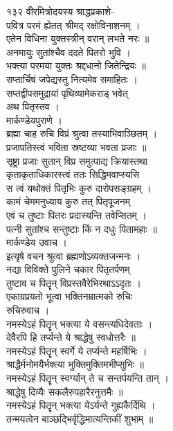 \documentclass[11pt, openany]{book}
\begin{document}
{{{{{{{{{{{{{{{{{{{{{{{{{{{{{{{{{{{{{{{{{{{{{{{{{{{{{{{{{१३२ }{ वीरमित्रोदयस्य श्राद्धप्रकाशे-}{\\
पवित्र परमं ह्येतत् श्रीमद् रक्षोविनाशनम् ।\\
एतेन विधिना युक्तस्त्रीन् वरान् लभते नरः ॥\\
अनमायुः सुतांश्चैव ददते पितरो भुवि ।\\
भक्त्या परमया युक्तः श्रद्दधानो जितेन्द्रियः ॥\\
सप्तार्चिषं जपेद्यस्तु नित्यमेव समाहितः ।\\
सप्तद्वीपसमुद्रायां पृथिव्यामेकराड् भवेत् \textbar{}\textbar{}\\
अथ पितृस्तव ।\\
मार्कण्डेयपुराणे ।\\
ब्रह्मा चाह रुचि विप्रं श्रुत्वा तस्याभिवाञ्छितम् ।\\
प्रजापतिस्त्वं भविता स्रष्टव्या भवता प्रजाः ॥\\
सृष्ट्रा प्रजाः सुतान् विप्र समुत्पाद्य क्रियास्तथा \textbar{}\\
कृताकृताधिकारस्त्वं ततः सिद्धिमवाप्स्यसि \textbar{}\textbar{}\\
स त्वं यथोक्तं पितृभिः कुरु दारोपसङ्ग्रहम् ।\\
कामं चेममनुध्याय कुरु तत् पितृपूजनम् \textbar{}\textbar{}\\
एवं च तुष्टाः पितरः प्रदास्यन्ति तवेप्सितम् ।\\
पत्नी सुतांश्च सन्तुष्टाः किं न दधुः पितामहाः ॥\\
मार्कण्डेय उवाच ।\\
इत्यृषे वचन श्रुत्वा ब्रह्मणोऽव्यक्तजन्मनः ।\\
नद्या विविक्ते पुलिने चकार पितृतर्पणम् \textbar{}\textbar{}\\
तुष्टाव च पितॄन् विप्रस्तवैरेभिरथाऽऽदृतः ।\\
एकाग्रप्रयतो भूत्वा भक्तिनम्रात्मको रुचिः \textbar{}\textbar{}\\
रुचिरुवाच ।\\
नमस्येऽहं पितॄन् भक्त्या ये वसन्त्यधिदेवताः ।\\
देवैरपि हि तर्प्यन्ते ये श्राद्धेषु स्वधोत्तरैः ॥\\
नमस्येऽहं पितॄन् स्वर्गे ये तर्प्यन्ते महर्षिभिः ।\\
श्राद्धैर्मनोमयैर्भक्त्या भुक्तिमुक्तिमभीप्सुभिः ॥\\
नमस्येऽहं पितॄन् स्वर्ग्यान् ते च सन्तर्पयन्ति तान् ।\\
श्राद्धेषु दिव्यैः सकलैरुपहारैरनुत्तमैः ॥\\
नमस्येऽहं पितॄन् भक्त्या येऽर्यन्ते गुह्यकैर्दिथि ।\\
तन्मयत्वेन बाञ्छद्भिर्वृद्धिमात्यन्तिकीं शुभाम् ॥\\


}}}}}}}}}}}}}}}}}}}}}}}}}}}}}}}}}}}}}}}}}}}}}}}}}}}}}}}}}
\end{document}
